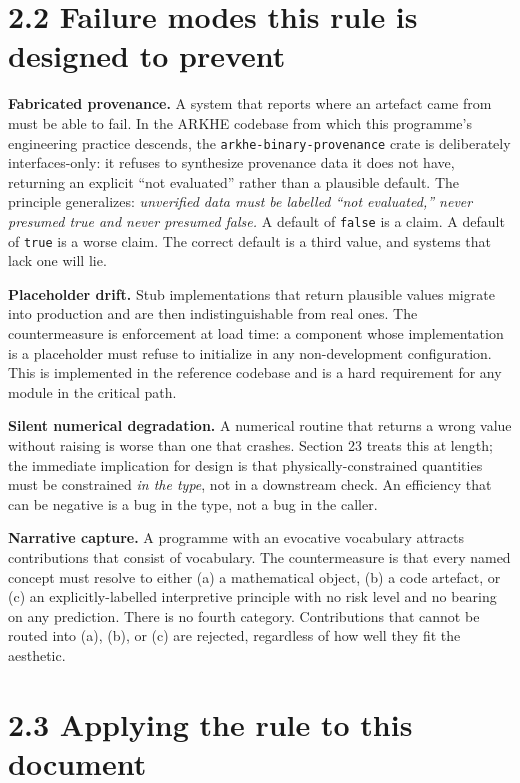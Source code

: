 \documentclass[
  11pt]{report}
\begin{document}
\hypertarget{failure-modes-this-rule-is-designed-to-prevent}{%
\section{2.2 Failure modes this rule is designed to
prevent}\label{failure-modes-this-rule-is-designed-to-prevent}}

\textbf{Fabricated provenance.} A system that reports where an artefact
came from must be able to fail. In the ARKHE codebase from which this
programme's engineering practice descends, the
\texttt{arkhe-binary-provenance} crate is deliberately interfaces-only:
it refuses to synthesize provenance data it does not have, returning an
explicit ``not evaluated'' rather than a plausible default. The
principle generalizes: \emph{unverified data must be labelled ``not
evaluated,'' never presumed true and never presumed false.} A default of
\texttt{false} is a claim. A default of \texttt{true} is a worse claim.
The correct default is a third value, and systems that lack one will
lie.

\textbf{Placeholder drift.} Stub implementations that return plausible
values migrate into production and are then indistinguishable from real
ones. The countermeasure is enforcement at load time: a component whose
implementation is a placeholder must refuse to initialize in any
non-development configuration. This is implemented in the reference
codebase and is a hard requirement for any module in the critical path.

\textbf{Silent numerical degradation.} A numerical routine that returns
a wrong value without raising is worse than one that crashes. Section 23
treats this at length; the immediate implication for design is that
physically-constrained quantities must be constrained \emph{in the
type}, not in a downstream check. An efficiency that can be negative is
a bug in the type, not a bug in the caller.

\textbf{Narrative capture.} A programme with an evocative vocabulary
attracts contributions that consist of vocabulary. The countermeasure is
that every named concept must resolve to either (a) a mathematical
object, (b) a code artefact, or (c) an explicitly-labelled interpretive
principle with no risk level and no bearing on any prediction. There is
no fourth category. Contributions that cannot be routed into (a), (b),
or (c) are rejected, regardless of how well they fit the aesthetic.

\hypertarget{applying-the-rule-to-this-document}{%
\section{2.3 Applying the rule to this
document}\label{applying-the-rule-to-this-document}}
\end{document}
